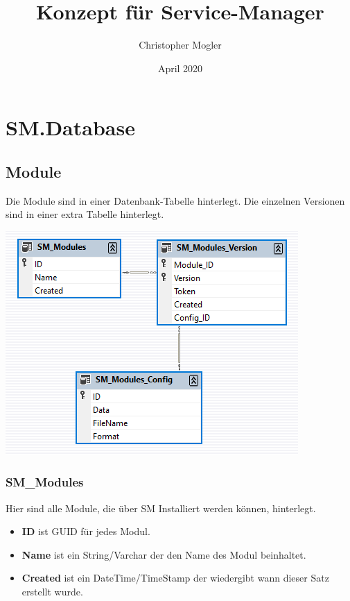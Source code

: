 \documentclass{article}
\title{Konzept für Service-Manager}
\author{Christopher Mogler}
\date{April 2020}
\begin{document}
\maketitle
\tableofcontents
\newpage

\section{SM.Database}

\subsection{Module}

Die Module sind in einer Datenbank-Tabelle hinterlegt. 
Die einzelnen Versionen sind in einer extra Tabelle hinterlegt.

\begin{center}
\includegraphics{db_modules}
\end{center}

\subsubsection{SM\_Modules}

Hier sind alle Module, die über SM Installiert werden können, hinterlegt.

\begin{itemize}
  \item \textbf{ID} ist GUID für jedes Modul.
  \item \textbf{Name} ist ein String/Varchar der den Name des Modul beinhaltet.
  \item \textbf{Created} ist ein DateTime/TimeStamp der wiedergibt wann dieser Satz erstellt wurde. 
\end{itemize}
\end{document}
